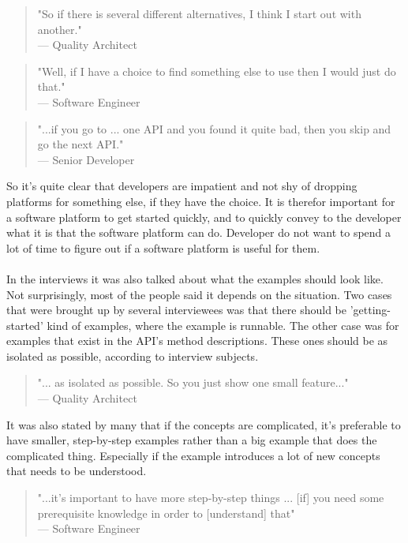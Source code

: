 \documentclass{cslthse-msc}
\begin{document}
    \begin{quote}
        "So if there is several different alternatives, I think I start out with another."\\
        --- Quality Architect
    \end{quote}
    \begin{quote}
        "Well, if I have a choice to find something else to use then I would just do that." \\
        --- Software Engineer
    \end{quote}
    \begin{quote}
        "...if you go to ... one API and you found it quite bad, then you skip and go the next API." \\
        --- Senior Developer
    \end{quote}
    So it's quite clear that developers are impatient and not shy of dropping platforms for something else, if they have the choice. It is therefor important for a software platform to get started quickly, and to quickly convey to the developer what it is that the software platform can do. Developer do not want to spend a lot of time to figure out if a software platform is useful for them.
    \\ \\
    In the interviews it was also talked about what the examples should look like. Not surprisingly, most of the people said it depends on the situation. Two cases that were brought up by several interviewees was that there should be 'getting-started' kind of examples, where the example is runnable. The other case was for examples that exist in the API's method descriptions. These ones should be as isolated as possible, according to interview subjects.
    \begin{quote}
        "... as isolated as possible. So you just show one small feature..." \\
        --- Quality Architect
    \end{quote}
    It was also stated by many that if the concepts are complicated, it's preferable to have smaller, step-by-step examples rather than a big example that does the complicated thing. Especially if the example introduces a lot of new concepts that needs to be understood.
    \begin{quote}
        "...it's important to have more step-by-step things ... [if] you need some prerequisite knowledge in order to [understand] that" \\
        --- Software Engineer
    \end{quote}
\end{document}
